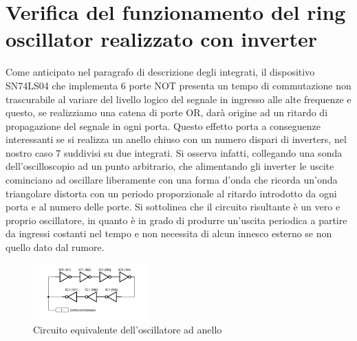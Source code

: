 \documentclass[journal]{IEEEtran}
\begin{document}
\section{Verifica del funzionamento del ring oscillator realizzato con inverter}
Come anticipato nel paragrafo di descrizione degli integrati, il dispositivo SN74LS04 che implementa 6 porte NOT presenta un tempo di commutazione non trascurabile al variare del livello logico del segnale in ingresso alle alte frequenze e questo, se realizziamo una catena di porte OR, darà origine ad un ritardo di propagazione del segnale in ogni porta. 
Questo effetto porta a conseguenze interessanti se si realizza un anello chiuso con un numero dispari di inverters, nel nostro caso 7 suddivisi su due integrati. Si osserva infatti, collegando una sonda dell'oscilloscopio ad un punto arbitrario, che alimentando gli inverter le uscite cominciano ad oscillare liberamente con una forma d'onda che ricorda un'onda triangolare distorta con un periodo proporzionale al ritardo introdotto da ogni porta e al numero delle porte. Si sottolinea che il circuito risultante è un vero e proprio oscillatore, in quanto è in grado di produrre un'uscita periodica a partire da ingressi costanti nel tempo e non necessita di alcun innesco esterno se non quello dato dal rumore.

\begin{figure}[H]%
\begin{center}
\includegraphics[width=0.40\textwidth]{sch-simulations/digital/output/ring-osc-logic.pdf}
\caption{Circuito equivalente dell'oscillatore ad anello}
\label{fig:circuit_ring_oscillator}
\end{center}
\end{figure}
\end{document}
